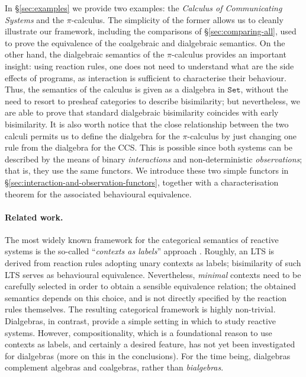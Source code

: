 \documentclass[orivec]{llncs}
\newcommand{\mC}[1]{\mathtt{#1}}
\newcommand{\Set}{\mC{Set}}
\begin{document}
In \S \ref{sec:examples} we provide two examples: the \emph{Calculus of Communicating Systems} and the $\pi$-calculus. The simplicity of the former allows us to cleanly illustrate our framework, including the comparisons of \S\ref{sec:comparing-all}, used to prove the equivalence of the coalgebraic and dialgebraic semantics. On the other hand, the dialgebraic semantics of the $\pi$-calculus provides an important insight: using reaction rules, one does not need to understand what are the side effects of programs, as interaction is sufficient to characterise their behaviour. Thus, the semantics of the calculus is given as a dialgebra in $\Set$, without the need to resort to presheaf categories to describe bisimilarity; but nevertheless, we are able to prove that standard dialgebraic bisimilarity coincides with early bisimilarity. It is also worth notice that the close relationship between the two calculi permits us to define the dialgebra for the $\pi$-calculus by just changing one rule from the dialgebra for the CCS.  This is possible since both systems can be described by the means of binary \emph{interactions} and non-deterministic \emph{observations}; that is, they use the same functors. We introduce these two simple functors in \S \ref{sec:interaction-and-observation-functors}, together with a characterisation theorem for the associated behavioural equivalence.



\paragraph{Related work.} The most widely known framework for the categorical semantics of reactive systems is the so-called ``\emph{contexts as labels}'' approach \cite{lm00,Sew02,ss03}. Roughly, an LTS is derived from reaction rules adopting unary contexts as labels; bisimilarity of such LTS serves as behavioural equivalence.
Nevertheless, \emph{minimal} contexts need to be carefully selected in order to obtain a sensible equivalence relation; the obtained semantics depends on this choice, and is not directly specified by the reaction rules themselves. The resulting categorical framework is highly non-trivial.
Dialgebras, in contrast, provide a simple setting in which to study reactive systems. However, compositionality, which is a foundational reason to use contexts as labels, and certainly a desired feature, has not yet been investigated for dialgebras (more on this in the conclusions). For the time being, dialgebras complement algebras and coalgebras, rather than \emph{bialgebras}. 
\end{document}
